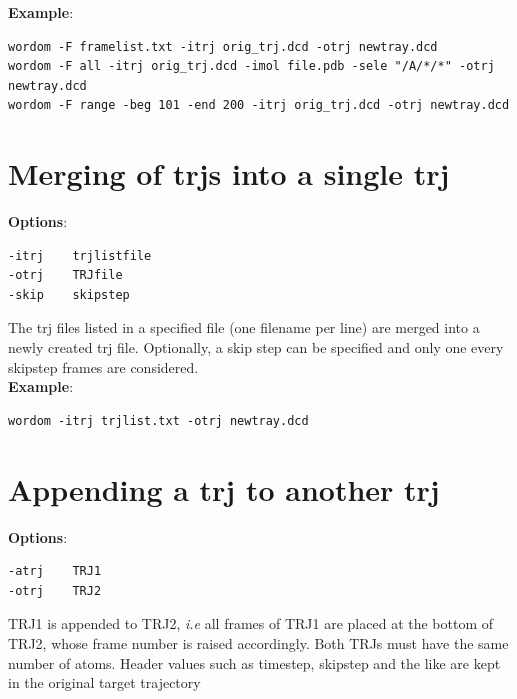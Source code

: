 \documentclass[11pt,twoside,onecolumn,a4paper,openright,notitlepage]{book}[2001/04/21]
\begin{document}
\textbf{\large Example}:
\begin{verbatim}
wordom -F framelist.txt -itrj orig_trj.dcd -otrj newtray.dcd
wordom -F all -itrj orig_trj.dcd -imol file.pdb -sele "/A/*/*" -otrj newtray.dcd
wordom -F range -beg 101 -end 200 -itrj orig_trj.dcd -otrj newtray.dcd
\end{verbatim}
%
\section{Merging of trjs into a single trj}
\textbf{\large Options}:
\begin{verbatim}
-itrj    trjlistfile
-otrj    TRJfile     
-skip    skipstep
\end{verbatim}
The trj files listed in a specified file (one filename per line) are merged into a newly created trj file. Optionally, a skip step can be specified and only one every skipstep frames are considered.\\

\textbf{\large Example}:
\begin{verbatim}
wordom -itrj trjlist.txt -otrj newtray.dcd
\end{verbatim}
%
%
\section{Appending a trj to another trj}
\textbf{\large Options}:
\begin{verbatim}
-atrj    TRJ1
-otrj    TRJ2     
\end{verbatim}
TRJ1 is appended to TRJ2, \emph{i.e} all frames of TRJ1 are placed at the bottom of TRJ2, whose frame number is raised accordingly. Both TRJs must have the same number of atoms. Header values such as timestep, skipstep and the like are kept in the original target trajectory\\
\end{document}
